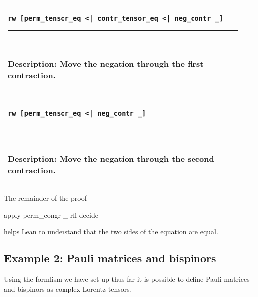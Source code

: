 \documentclass[a4paper, 11pt]{article}
\newcommand{\proofstep}[3]{
  \arrayrulecolor{mycolor}
\begin{center}
\begin{tabular}{|p{3in}| p{3in}|}
\hline
{#1
}\newline 
\hrule~\newline
#2
  & ~\newline
\makebox[3in]{%
#3}
  \\ \hline
\end{tabular}
\end{center}
\arrayrulecolor{black}
}
\begin{document}
\proofstep{\lstinline!rw [perm_tensor_eq <| contr_tensor_eq <| neg_contr _]!}{
  Description: Move the negation through the first contraction.
}{
  \begin{tikzpicture}
    \node[draw=black] (A) at (0,0) {perm};
    \node[draw=black] (B) at (0,-1) {contr 0 0};
    \node[draw=red] (C) at (0,-2) {neg};
    \node[draw=red] (D) at (0,-3) {contr 0 1};
    \node[draw=black] (E) at (0,-4) {prod};
    \node[draw=black] (F1) at (-1,-5) {A};
    \node[draw=black] (F2) at (1,-5) {S};
    \path [->] (A) edge (B);
    \path [->] (B) edge (C);
    \path [->, color = red] (C) edge (D);
    \path [->, color = red] (D) edge (E);
    \path [->] (E) edge (F1);
    \path [->] (E) edge (F2);
  \end{tikzpicture}
}

\proofstep{\lstinline!rw [perm_tensor_eq <| neg_contr _]!}{
  Description: Move the negation through the second contraction.
}{
  \begin{tikzpicture}
    \node[draw=black] (A) at (0,0) {perm};
    \node[draw=red] (B) at (0,-1) {neg};
    \node[draw=red] (C) at (0,-2) {contr 0 0};
    \node[draw=black] (D) at (0,-3) {contr 0 1};
    \node[draw=black] (E) at (0,-4) {prod};
    \node[draw=black] (F1) at (-1,-5) {A};
    \node[draw=black] (F2) at (1,-5) {S};
    \path [->] (A) edge (B);
    \path [->, color = red] (B) edge (C);
    \path [->, color = red] (C) edge (D);
    \path [->] (D) edge (E);
    \path [->] (E) edge (F1);
    \path [->] (E) edge (F2);
  \end{tikzpicture}
}

The remainder of the proof
\begin{code}
  apply perm_congr _ rfl
  decide
\end{code}
helps Lean to understand that the two sides of the equation are equal.
\subsection{Example 2: Pauli matrices and bispinors} \label{sec:examplePauliBispinor}
Using the formlism we have set up thus far it is possible to define Pauli matrices and bispinors 
as complex Lorentz tensors.
 
\end{document}
